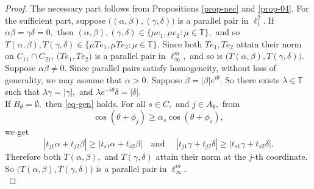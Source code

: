 \documentclass{amsart}
\theoremstyle{definition}
\theoremstyle{remark}
\numberwithin{equation}{section}
\begin{document}
\begin{proof}
	The necessary part follows from  Propositions \ref{prop-nec}  and  \ref{prop-04}. 	For the sufficient part, suppose $\Big((\alpha,\beta),(\gamma,\delta)\Big)$ is a parallel pair in $\ell_1^2.$ If $\alpha\beta=\gamma\delta=0,$ then $(\alpha,\beta),(\gamma,\delta)\in \{\mu e_1,\mu e_2:\mu\in \mathbb{T}\},$ and so  $T(\alpha,\beta),T(\gamma,\delta)\in  \{\mu Te_1,\mu Te_2:\mu\in \mathbb{T}\}.$ Since both $Te_1,Te_2$ attain their norm on $C_{11}\cap C_{21}$, $\Big(Te_1,Te_2\Big)$ is a parallel pair in $\ell_\infty^m,$ and so is $\Big(T(\alpha,\beta),T(\gamma,\delta)\Big).$ Suppose $\alpha\beta\neq 0.$ Since parallel pairs satisfy homogeneity, without loss of generality, we may assume that $\alpha> 0.$ Suppose $\beta=|\beta|e^{i\theta}.$ %
	So there exists $\lambda\in \mathbb{T}$ such that %
	 $\lambda\gamma=|\gamma|,$ and $\lambda e^{-i\theta}\delta=|\delta|.$ \\ 
	  
	 If $B_\theta=\emptyset,$ then \eqref{eq-gen} holds. For all $s\in C,$ and $j\in A_\theta,$ from $$	\cos(\theta+\phi_j)\geq \alpha_s\cos(\theta+\phi_s),$$ we get
	 \begin{equation}\label{eq-n0} 
	 |t_{j1}\alpha+t_{j2}\beta|\geq |t_{s1}\alpha+t_{s2}\beta| \quad \text{and } \quad 	|t_{j1}\gamma+t_{j2}\delta|\geq |t_{s1}\gamma+t_{s2}\delta |.
	 \end{equation}
	 Therefore both $T(\alpha,\beta),$ and $ T(\gamma,\delta)$ attain their norm at the $j$-th coordinate. So $\Big(T(\alpha,\beta),T(\gamma,\delta)\Big)$ is a parallel pair in $\ell_\infty^m.$ \\
	 

\end{proof}
\end{document}
